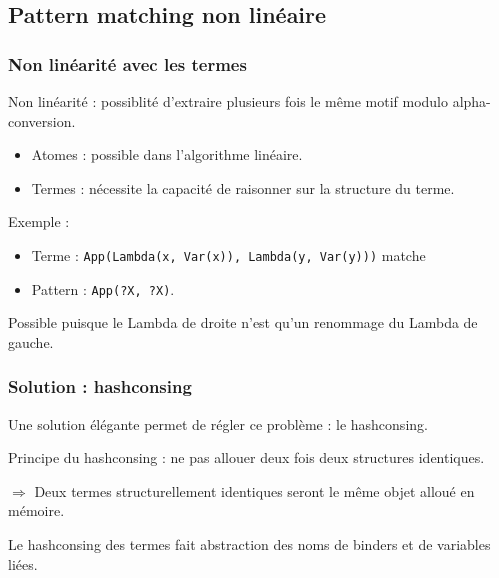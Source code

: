 \subsection{Pattern matching non linéaire}

\begin{frame}
\frametitle{Non linéarité avec les termes}

Non linéarité : possiblité d'extraire plusieurs fois le même motif modulo
alpha-conversion.
\begin{itemize}
\item Atomes : possible dans l'algorithme linéaire.
\item Termes : nécessite la capacité de raisonner sur la structure du terme.
\end{itemize}

\bigskip

Exemple :
\begin{itemize}
\item Terme : \texttt{App(Lambda(x, Var(x)), Lambda(y, Var(y)))} matche 
\item Pattern : \texttt{App(?X, ?X)}.
\end{itemize} 

\medskip

Possible puisque le Lambda de droite n'est qu'un renommage du
Lambda de gauche.

\end{frame}

\begin{frame}
\frametitle{Solution : hashconsing}

Une solution élégante permet de régler ce problème : le hashconsing. 

Principe du hashconsing : ne pas allouer deux fois deux structures
identiques. 

\medskip

$\Rightarrow$ Deux termes structurellement identiques seront
le même objet alloué en mémoire.

\bigskip

Le hashconsing des termes fait abstraction des noms de binders et de variables
liées.

\end{frame}


